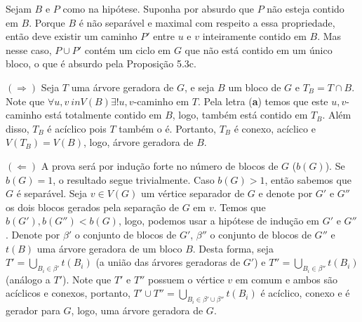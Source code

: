 
 Sejam $B$ e $P$ como na hipótese. Suponha por absurdo que $P$ não
esteja contido em $B$. Porque $B$ é não separável e maximal com respeito a essa
propriedade, então deve existir um caminho $P'$ entre $u$ e $v$ inteiramente
contido em $B$. Mas nesse caso, $P \cup P'$ contém um ciclo em $G$ que não está
contido em um único bloco, o que é absurdo pela Proposição 5.3c.

$(\Rightarrow)$ Seja $T$ uma árvore geradora de $G$, e seja $B$ um bloco de $G$
e $T_B = T \cap B$. Note que $\forall u,v \ in V(B) \exists! u,v$-caminho em $T$.
Pela letra ({\bf a}) temos que este $u,v$-caminho está totalmente contido em $B$,
logo, também está contido em $T_B$. Além disso, $T_B$ é acíclico pois $T$ também
o é. Portanto, $T_B$ é conexo, acíclico e $V(T_B) = V(B)$, logo, árvore geradora
de $B$.

$(\Leftarrow)$  A prova será por indução forte no número de blocos de $G$ 
($b(G)$). Se $b(G) = 1$, o resultado segue trivialmente. Caso $b(G) > 1$, então
sabemos que $G$ é separável. Seja $v \in V(G)$ um vértice separador de $G$ e
denote por $G'$ e $G''$ os dois blocos gerados pela separação de $G$ em $v$.
Temos que $b(G'),b(G'') < b(G)$, logo, podemos usar a hipótese de indução em 
$G'$ e $G''$. Denote por $\beta'$ o conjunto de blocos de $G'$, $\beta''$ o 
conjunto de blocos de $G''$ e $t(B)$ uma árvore geradora de um bloco $B$. 
Desta forma, seja $T' = \bigcup_{B_i \in \beta'} t(B_i)$ (a união
das árvores geradoras de $G'$) e $T'' = \bigcup_{B_i \in \beta''} t(B_i)$ (análogo
a $T'$). Note que $T'$ e $T''$ possuem o vértice $v$ em comum e ambos são
acíclicos e conexos, portanto, $T' \cup T'' = \bigcup_{B_i \in \beta' \cup \beta''} t(B_i)$
 é acíclico, conexo e é gerador para $G$, logo, uma árvore geradora de $G$.
\fimprova



